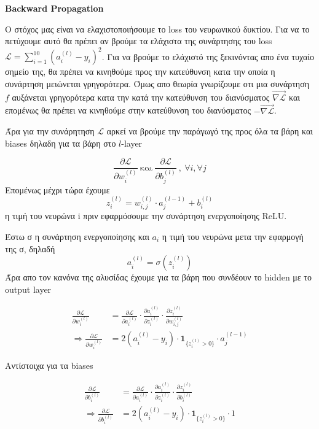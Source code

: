 \documentclass[a4paper,12pt]{article}
\begin{document}
\newpage
\section*{}
\begin{center}
    \Large \textbf{Backward Propagation}
\end{center}

Ο στόχος μας είναι να ελαχιστοποιήσουμε το loss του νευρωνικού δυκτίου. Για να το πετύχουμε αυτό θα πρέπει αν βρούμε τα ελάχιστα της συνάρτησης του loss $\mathcal{L} = \sum_{i=1}^{10} (a_i^{(l)} - y_i)^2$. Για να βρούμε το ελάχιστό της ξεκινόντας απο ένα τυχαίο σημείο της, θα πρέπει να κινηθούμε προς την κατεύθυνση κατα την οποία η συνάρτηση μειώνεται γρηγορότερα.  Όμως απο θεωρία γνωρίζουμε οτι μια συνάρτηση $f$ αυξάνεται γρηγορότερα κατα την κατά την κατεύθυνση του διανύσματος $\overrightarrow{\nabla \mathcal{L}}$ και επομένως θα πρέπει να κινηθούμε στην κατεύθυνση του διανύσματος $-\overrightarrow{\nabla \mathcal{L}}$. 

Άρα για την συνάρητηση $\mathcal{L}$ αρκεί να βρούμε την παράγωγό της προς όλα τα βάρη και biases δηλαδη για τα βάρη στο $l$-layer

$$
\frac{\partial \mathcal{L}}{\partial w_{i}^{(l)}}  \    \text{και} \  \frac{\partial \mathcal{L}}{\partial b_{j}^{(l)}}
\ , \ \forall i , \forall j
$$
Επομένως μέχρι τώρα έχουμε
\[
z_{i}^{(l)} = w_{i,j}^{(l)} \cdot a_{j}^{(l-1)} + b_{i}^{(l)}
\]
η τιμή του νευρώνα i πριν εφαρμόσουμε την συνάρτηση ενεργοποίησης ReLU.

Έστω σ η συνάρτηση ενεργοποίησης και $a_i$ η τιμή του νευρώνα μετα την εφαρμογή της σ, δηλαδή
\[
a_{i}^{(l)} = σ(z_{i}^{(l)})
\]
Άρα απο τον κανόνα της αλυσίδας έχουμε για τα βάρη που συνδέουν το hidden με το output layer

\begin{align}
\frac{\partial \mathcal{L}}{\partial w_{i}^{(l)}}  &= \frac{\partial \mathcal{L}}{\partial a_{i}^{(l)}}  \cdot \frac{\partial a_{i}^{(l)}}{\partial z_{i}^{(l)}}  \cdot \frac{\partial z_{i}^{(l)}}{\partial w_{i,j}^{(l)}} \label{eq:grad_weight_l1} \\
\Rightarrow \frac{\partial \mathcal{L}}{\partial w_{i}^{(l)}} &= 2(a_i^{(l)} - y_{i}) \cdot \mathbf{1}_{\{z_{i}^{(l)}>0\} } \cdot a_{j}^{(l-1)} \label{eq:grad_weight_l2}
\end{align}

Αντίστοιχα για τα biases

\begin{align}
\frac{\partial \mathcal{L}}{\partial b_{i}^{(l)}}  &= \frac{\partial \mathcal{L}}{\partial a_{i}^{(l)}}  \cdot \frac{\partial a_{i}^{(l)}}{\partial z_{i}^{(l)}}  \cdot \frac{\partial z_{i}^{(l)}}{\partial b_{i}^{(l)}} \label{eq:grad_bias_l1} \\
\Rightarrow \frac{\partial \mathcal{L}}{\partial b_{i}^{(l)}} &= 2(a_i^{(l)} - y_{i}) \cdot \mathbf{1}_{\{z_{i}^{(l)}>0\} } \cdot 1 \label{eq:grad_bias_l2}
\end{align}
\end{document}
